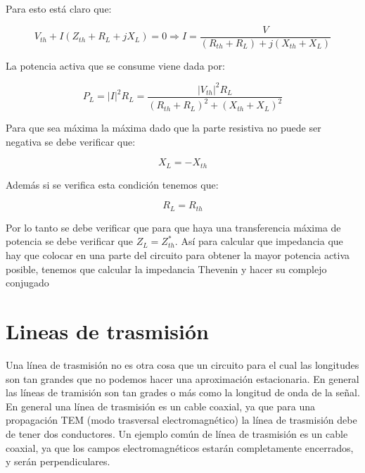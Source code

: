 \documentclass[12pt]{article}
\begin{document}
Para esto está claro que:

\begin{equation}
V_{th} + I(Z_{th}+R_L + j X_L) = 0 \Longrightarrow I = \dfrac{V}{(R_{th}+R_L)+j(X_{th}+X_L)}
\end{equation}

La potencia activa que se consume viene dada por:

\begin{equation}
P_L = |I|^2 R_L = \dfrac{|V_{th}|^2 R_L}{(R_{th}+R_L)^2+(X_{th}+X_L)^2}
\end{equation}

Para que sea máxima la máxima dado que la parte resistiva no puede ser negativa se debe verificar que:

\begin{equation}
X_L = -X_{th} 
\end{equation}

Además si se verifica esta condición tenemos que:

\begin{equation}
R_L = R_{th}
\end{equation}

Por lo tanto se debe verificar que para que haya una transferencia máxima de potencia se debe verificar que $Z_L = Z_{th}^*$. Así para calcular que impedancia que hay que colocar en una parte del circuito para obtener la mayor potencia activa posible, tenemos que calcular la impedancia Thevenin y hacer su complejo conjugado

\newpage

\section{Lineas de trasmisión}

Una línea de trasmisión no es otra cosa que un circuito para el cual las longitudes son tan grandes que no podemos hacer una aproximación estacionaria. En general las líneas de tramisión son tan grades o más como la longitud de onda de la señal.  \\

En general una línea de trasmisión es un cable coaxial, ya que para una propagación TEM (modo trasversal electromagnético) la línea de trasmisión debe de tener dos conductores. Un ejemplo común de línea de trasmisión es un cable coaxial, ya que los campos electromagnéticos estarán completamente encerrados, y serán perpendiculares. \\
\end{document}

